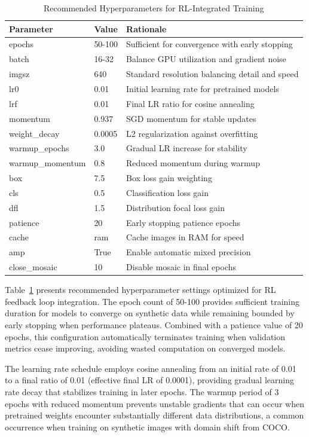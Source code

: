 \begin{table}[htbp]
\centering
\caption{Recommended Hyperparameters for RL-Integrated Training}
\label{tab:hyperparameters}
\begin{tabular}{p{3.5cm}p{2.5cm}p{6cm}}
\toprule
\textbf{Parameter} & \textbf{Value} & \textbf{Rationale} \\
\midrule
epochs & 50-100 & Sufficient for convergence with early stopping \\
batch & 16-32 & Balance GPU utilization and gradient noise \\
imgsz & 640 & Standard resolution balancing detail and speed \\
lr0 & 0.01 & Initial learning rate for pretrained models \\
lrf & 0.01 & Final LR ratio for cosine annealing \\
momentum & 0.937 & SGD momentum for stable updates \\
weight\_decay & 0.0005 & L2 regularization against overfitting \\
warmup\_epochs & 3.0 & Gradual LR increase for stability \\
warmup\_momentum & 0.8 & Reduced momentum during warmup \\
box & 7.5 & Box loss gain weighting \\
cls & 0.5 & Classification loss gain \\
dfl & 1.5 & Distribution focal loss gain \\
patience & 20 & Early stopping patience epochs \\
cache & ram & Cache images in RAM for speed \\
amp & True & Enable automatic mixed precision \\
close\_mosaic & 10 & Disable mosaic in final epochs \\
\bottomrule
\end{tabular}
\end{table}

Table~\ref{tab:hyperparameters} presents recommended hyperparameter settings optimized for RL feedback loop integration. The epoch count of 50-100 provides sufficient training duration for models to converge on synthetic data while remaining bounded by early stopping when performance plateaus. Combined with a patience value of 20 epochs, this configuration automatically terminates training when validation metrics cease improving, avoiding wasted computation on converged models.

The learning rate schedule employs cosine annealing from an initial rate of 0.01 to a final ratio of 0.01 (effective final LR of 0.0001), providing gradual learning rate decay that stabilizes training in later epochs. The warmup period of 3 epochs with reduced momentum prevents unstable gradients that can occur when pretrained weights encounter substantially different data distributions, a common occurrence when training on synthetic images with domain shift from COCO.

